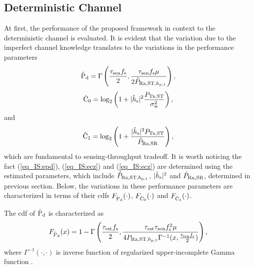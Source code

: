 \subsection{Deterministic Channel} \label{ssec_IS:det_th}
At first, the performance of the proposed framework in context to the deterministic channel is evaluated.
It is evident that the variation due to the imperfect channel knowledge translates to the variations in the performance parameters 
\begin{align}
\hat{\text{P}}_{\text{d}} = \Gamma\left( \frac{\tau_{\text{sen}} f_{\text{s}}}{2}, \frac{\tau_{\text{sen}} f_{\text{s}} \mu}{2 \hat{P}_{\text{Rx,ST,$h_{\text{p,1}}$}}} \right),  \label{eq_IS:epd} 
\end{align}
\begin{align}
\hat{\text{C}}_{\text{0}} = \log_2 \left(1 + |\hat{h}_{\text{s}}|^2 \frac{P_{\text{Tx,ST}}}{\sigma^2_{\text{w}}}\right), 
\label{eq_IS:ecz} 
\end{align}
and 
\begin{align}
\hat{\text{C}}_{\text{1}} = \log_2 \left(1 + \frac{|\hat{h}_{\text{s}}|^2 P_{\text{Tx,ST}} }{\hat{P}_{\text{Rx,SR}}} \right), 
\label{eq_IS:eco} 
\end{align}
which are fundamental to sensing-throughput tradeoff. It is worth noticing the fact (\ref{eq_IS:epd}), (\ref{eq_IS:ecz}) and (\ref{eq_IS:ecz}) are determined using the estimated parameters, which include $\hat{P}_{\text{Rx,ST,$h_{\text{p,1}}$}}$, $|\hat{h}_{\text{s}}|^2$ and $\hat{P}_{\text{Rx,SR}}$, determined in previous section. Below, the variations in these performance parameters are characterized in terms of their cdfs $F_{\hat{\text{P}}_{\text{d}}}(\cdot)$, $F_{\hat{\text{C}}_{\text{0}}}(\cdot)$ and $F_{\hat{\text{C}}_{\text{1}}}(\cdot)$.  
\begin{lemma} \label{lm_IS:lem1}
\normalfont
The cdf of $\hat{\text{P}}_{\text{d}}$ is characterized as 
\begin{align}
F_{\hat{\text{P}}_{\text{d}}}(x) = 1 - \Gamma \left(\frac{\tau_{\text{est}} f_{\text{s}}}{2}, \frac{\tau_{\text{est}} \tau_{\text{sen}} f_{\text{s}}^2 \mu}{4 P_{\text{Rx,ST,$h_{\text{p,1}}$}} \Gamma^{-1}(x, \frac{\tau_{\text{sen}} f_{\text{s}}}{2}) } \right), 
\label{eq_IS:fpd}
\end{align}
where $\Gamma^{-1}(\cdot, \cdot)$ is inverse function of regularized upper-incomplete Gamma function \cite{grad}.  
\end{lemma} 
